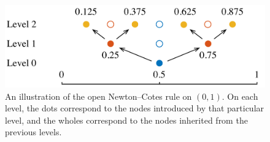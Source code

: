 \begin{figure}[t]
  \centering
  \includegraphics[width=1.0\columnwidth]{include/assets/figures/rule.pdf}
  \caption{
    An illustration of the open Newton--Cotes rule on $(0, 1)$. On each level,
    the dots correspond to the nodes introduced by that particular level, and
    the wholes correspond to the nodes inherited from the previous levels.
  }
\end{figure}
